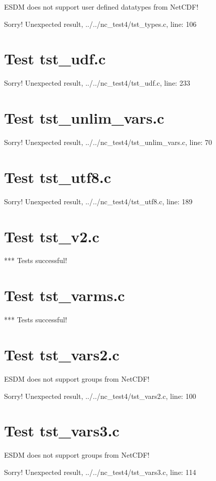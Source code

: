 ESDM does not support user defined datatypes from NetCDF!

Sorry! Unexpected result, ../../nc\_test4/tst\_types.c, line: 106

\section{Test tst\_udf.c}

Sorry! Unexpected result, ../../nc\_test4/tst\_udf.c, line: 233

\section{Test tst\_unlim\_vars.c}

Sorry! Unexpected result, ../../nc\_test4/tst\_unlim\_vars.c, line: 70

\section{Test tst\_utf8.c}

Sorry! Unexpected result, ../../nc\_test4/tst\_utf8.c, line: 189

\section{Test tst\_v2.c}

*** Tests successful!

\section{Test tst\_varms.c}

*** Tests successful!

\section{Test tst\_vars2.c}

ESDM does not support groups from NetCDF!

Sorry! Unexpected result, ../../nc\_test4/tst\_vars2.c, line: 100

\section{Test tst\_vars3.c}

ESDM does not support groups from NetCDF!

Sorry! Unexpected result, ../../nc\_test4/tst\_vars3.c, line: 114

